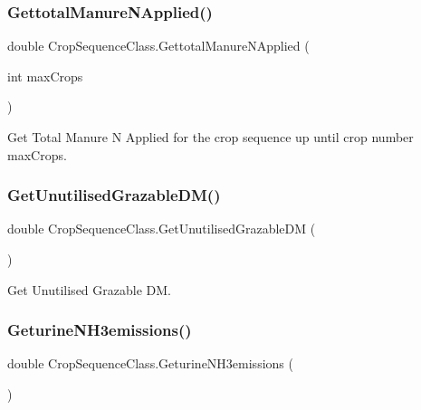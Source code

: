 \subsubsection{\texorpdfstring{GettotalManureNApplied()}{GettotalManureNApplied()}\hspace{0.1cm}{\footnotesize\ttfamily [2/2]}}
{\footnotesize\ttfamily double Crop\+Sequence\+Class.\+Gettotal\+Manure\+N\+Applied (\begin{DoxyParamCaption}\item[{int}]{max\+Crops }\end{DoxyParamCaption})\hspace{0.3cm}{\ttfamily [inline]}}



Get Total Manure N Applied for the crop sequence up until crop number max\+Crops. 

\mbox{\label{class_crop_sequence_class_a5a8f90566c9a156ed63c8288b5680456}} 
\subsubsection{\texorpdfstring{GetUnutilisedGrazableDM()}{GetUnutilisedGrazableDM()}}
{\footnotesize\ttfamily double Crop\+Sequence\+Class.\+Get\+Unutilised\+Grazable\+DM (\begin{DoxyParamCaption}{ }\end{DoxyParamCaption})\hspace{0.3cm}{\ttfamily [inline]}}



Get Unutilised Grazable DM. 

\mbox{\label{class_crop_sequence_class_a8016dda941183a9d6c82e843be2016c4}} 
\subsubsection{\texorpdfstring{GeturineNH3emissions()}{GeturineNH3emissions()}\hspace{0.1cm}{\footnotesize\ttfamily [1/2]}}
{\footnotesize\ttfamily double Crop\+Sequence\+Class.\+Geturine\+N\+H3emissions (\begin{DoxyParamCaption}{ }\end{DoxyParamCaption})\hspace{0.3cm}{\ttfamily [inline]}}



